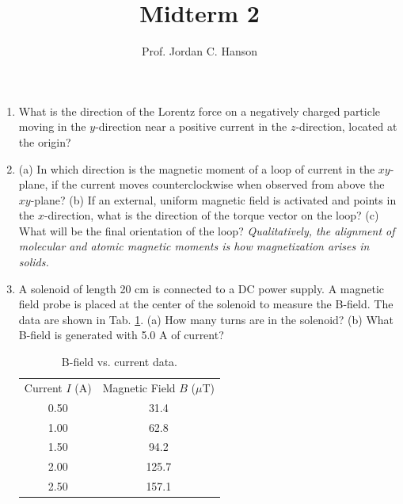 \documentclass[12pt,twocolumn]{article}
\title{Midterm 2}
\author{Prof. Jordan C. Hanson}
\begin{document}
\maketitle
\small

\begin{enumerate}
\item What is the direction of the Lorentz force on a negatively charged particle moving in the $y$-direction near a positive current in the $z$-direction, located at the origin?
\item (a) In which direction is the magnetic moment of a loop of current in the $xy$-plane, if the current moves counterclockwise when observed from above the $xy$-plane? (b) If an external, uniform magnetic field is activated and points in the $x$-direction, what is the direction of the torque vector on the loop? (c) What will be the final orientation of the loop?  \textit{Qualitatively, the alignment of molecular and atomic magnetic moments is how magnetization arises in solids.}
\item A solenoid of length 20 cm is connected to a DC power supply.  A magnetic field probe is placed at the center of the solenoid to measure the B-field. The data are shown in Tab. \ref{tab:1}. (a)  How many turns are in the solenoid? (b) What B-field is generated with 5.0 A of current?

\begin{table}
\centering
\begin{tabular}{| c c |}
\hline
Current $I$ (A) & Magnetic Field $B$ ($\mu$T) \\
0.50 & 31.4 \\
1.00 & 62.8 \\
1.50 & 94.2 \\
2.00 & 125.7 \\
2.50 & 157.1 \\
\hline
\end{tabular}
\caption{\label{tab:1} B-field vs. current data.}
\end{table}


\end{enumerate}
\end{document}
